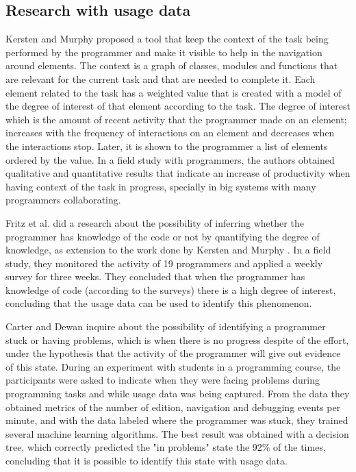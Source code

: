 \subsection{Research with usage data}
Kersten and Murphy \cite{KM06} proposed a tool that keep the context of the task being performed by the programmer and make it visible to help in the navigation around elements. The context is a graph of classes, modules and functions that are relevant for the current task and that are needed to complete it. Each element related to the task has a weighted value that is created with a model of the degree of interest of that element according to the task. The degree of interest which is the amount of recent activity that the programmer made on an element; increases with the frequency of interactions on an element and decreases when the interactions stop. Later, it is shown to the programmer a list of elements ordered by the value. In a field study with programmers, the authors obtained qualitative and quantitative results that indicate an increase of productivity when having context of the task in progress, specially in big systems with many programmers collaborating.

Fritz et al. \cite{FMH07} did a research about the possibility of inferring whether the programmer has knowledge of the code or not by quantifying the degree of knowledge, as extension to the work done by Kersten and Murphy \cite{KM06}. In a field study, they monitored the activity of 19 programmers and applied a weekly survey for three weeks. They concluded that when the programmer has knowledge of code (according to the surveys) there is a high degree of interest, concluding that the usage data can be used to identify this phenomenon.

Carter and Dewan \cite{CD10} inquire about the possibility of identifying a programmer stuck or having problems, which is when there is no progress despite of the effort, under the hypothesis that the activity of the programmer will give out evidence of this state. During an experiment with students in a programming course, the participants were asked to indicate when they were facing problems during programming tasks and while usage data was being captured. From the data they obtained metrics of the number of edition, navigation and debugging events per minute, and with the data labeled where the programmer was stuck, they trained several machine learning algorithms. The best result was obtained with a decision tree, which correctly predicted the "in problems" state the 92\% of the times, concluding that it is possible to identify this state with usage data.

